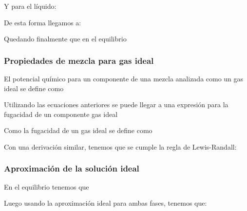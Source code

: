 
Y para el líquido:

De esta forma llegamos a:


Quedando finalmente que en el equilibrio


\subsubsection{Propiedades de mezcla para gas ideal}

El potencial químico para un componente de una mezcla analizada como un gas ideal se define como


Utilizando las ecuaciones anteriores se puede llegar a una expresión para la fugacidad de un componente gas ideal


Como la fugacidad de un gas ideal se define como


Con una derivación similar, tenemos que se cumple la regla de Lewis-Randall:

\subsubsection{Aproximación de la solución ideal}

En el equilibrio tenemos que


Luego usando la aproximación ideal para ambas fases, tenemos que:


